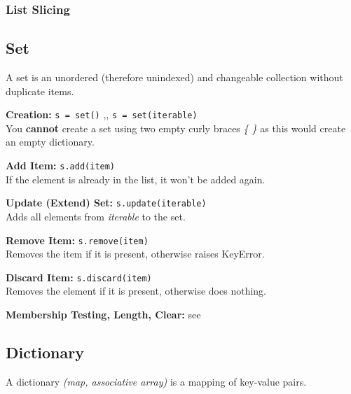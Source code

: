         \subsubsection{List Slicing} \label{List Slicing}

    \subsection{Set}
        A set is an unordered (therefore unindexed) and  changeable collection without duplicate
        items.

        \begin{indentblock}

            \textbf{Creation:} \texttt{s = set()} \sep{,}
        \texttt{s = set(iterable)} \\
        You \textbf{cannot} create a set using two empty curly braces \textit{\{ \}} as this would
        create an empty dictionary.

            \textbf{Add Item:} \texttt{s.add(item)} \\
        If the element is already in the list, it won't be added again.

            \textbf{Update (Extend) Set:} \texttt{s.update(iterable)} \\
        Adds all elements from \textit{iterable} to the set.

            \textbf{Remove Item:} \texttt{s.remove(item)} \\
        Removes the item if it is present, otherwise raises KeyError.

            \textbf{Discard Item:} \texttt{s.discard(item)} \\
        Removes the element if it is present, otherwise does nothing.

            \textbf{Membership Testing, Length, Clear:} see 

         \end{indentblock}

    \subsection{Dictionary}
        A dictionary \textit{(map, associative array)} is a mapping of key-value pairs.


